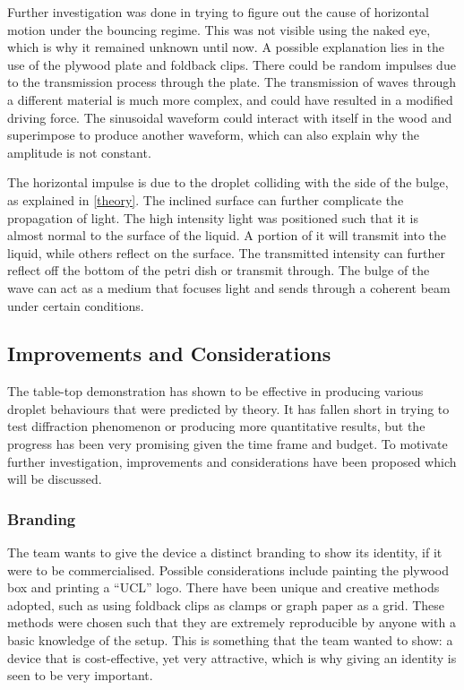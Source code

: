 Further investigation was done in trying to figure out the cause of horizontal motion under the bouncing regime. This was not visible using the naked eye, which is why it remained unknown until now. A possible explanation lies in the use of the plywood plate and foldback clips. There could be random impulses due to the transmission process through the plate. The transmission of waves through a different material is much more complex, and could have resulted in a modified driving force. The sinusoidal waveform could interact with itself in the wood and superimpose to produce another waveform, which can also explain why the amplitude is not constant.

The horizontal impulse is due to the droplet colliding with the side of the bulge, as explained in \ref{theory}. The inclined surface can further complicate the propagation of light. The high intensity light was positioned such that it is almost normal to the surface of the liquid. A portion of it will transmit into the liquid, while others reflect on the surface. The transmitted intensity can further reflect off the bottom of the petri dish or transmit through. The bulge of the wave can act as a medium that focuses light and sends through a coherent beam under certain conditions.

\subsection{Improvements and Considerations}
The table-top demonstration has shown to be effective in producing various droplet behaviours that were predicted by theory. It has fallen short in trying to test diffraction phenomenon or producing more quantitative results, but the progress has been very promising given the time frame and budget. To motivate further investigation, improvements and considerations have been proposed which will be discussed.

\subsubsection{Branding}
The team wants to give the device a distinct branding to show its identity, if it were to be commercialised. Possible considerations include painting the plywood box and printing a ``UCL'' logo. There have been unique and creative methods adopted, such as using foldback clips as clamps or graph paper as a grid. These methods were chosen such that they are extremely reproducible by anyone with a basic knowledge of the setup. This is something that the team wanted to show: a device that is cost-effective, yet very attractive, which is why giving an identity is seen to be very important.

